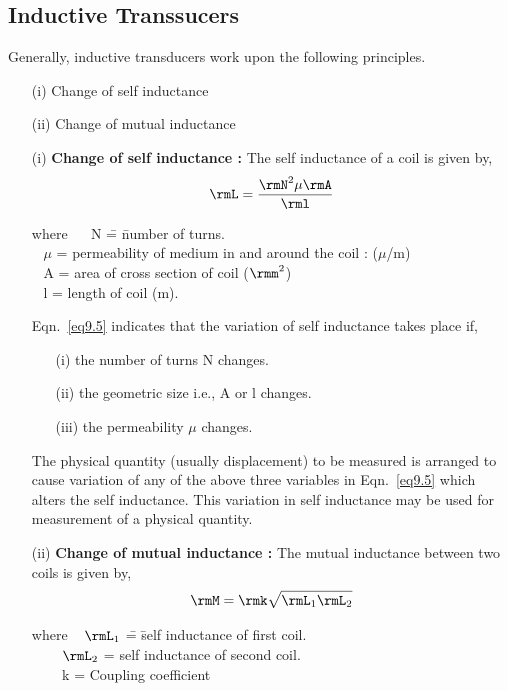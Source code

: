 \subsection{Inductive Transsucers}\label{sec9.6.2}
Generally, inductive transducers work upon the following principles.
\begin{itemize}
\item[(i)] Change of self inductance

\item[(ii)] Change of mutual inductance
\end{itemize}
\begin{itemize}
\item[(i)] \textbf{Change of self inductance :} The self inductance of
a coil is given by,
\begin{equation}
\rmL = \frac{\rmN^2 \mu \rmA}{\rml} \label{eq9.5}
\end{equation}
\begin{tabbing}
where ~~ N \= = \= number of turns.\\[3pt]
\qquad \quad~ $\mu$ \> = \> permeability of medium in and around the coil : ($\mu$/m)\\[3pt]
\qquad \quad~ A \> = \> area of cross section of coil ($\rmm^2$)\\[3pt]
\qquad \quad~ l \> = \> length of coil (m).
\end{tabbing}

Eqn.~\eqref{eq9.5} indicates that the variation of self inductance
takes place if,
\begin{itemize}
\item[(i)] the number of turns N changes.

\item[(ii)] the geometric size i.e., A or l changes.

\item[(iii)] the permeability $\mu$ changes.
\end{itemize}

The physical quantity (usually displacement) to be measured is
arranged to cause variation of any of the above three variables in
Eqn.~\eqref{eq9.5} which alters the self inductance. This variation in
self inductance may be used for measurement of a physical quantity.

\item[(ii)] \textbf{Change of mutual inductance :} The mutual
inductance between two coils is given by,
\begin{equation}
\rmM = \rmk \sqrt{\rmL_1 \rmL_2} \label{eq9.6}
\end{equation}
\begin{tabbing}
where ~ $\rmL_1$ \= = \= self inductance of first coil.\\[3pt]
\qquad ~~ ~ $\rmL_2$ \> = \> self inductance of second coil.\\[3pt]
\qquad ~~ ~ k \>  = \> Coupling coefficient 
\end{tabbing}
\end{itemize}

